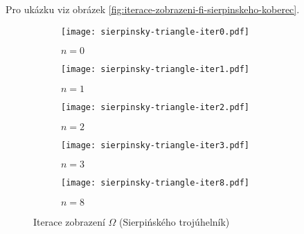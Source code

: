 Pro ukázku viz obrázek \ref{fig:iterace-zobrazeni-fi-sierpinskeho-koberec}.
\clearpage
\begin{figure}[h]
    \centering
    \begin{subfigure}{0.45\textwidth}
        \centering
        \texttt{[image: sierpinsky-triangle-iter0.pdf]}
        \begin{center}
            $n=0$
        \end{center}
    \end{subfigure}
    \qquad
    \vspace{1cm}
    \begin{subfigure}{0.45\textwidth}
        \centering
        \texttt{[image: sierpinsky-triangle-iter1.pdf]}
        \begin{center}
            $n=1$
        \end{center}
    \end{subfigure}
    \qquad
    \begin{subfigure}{0.45\textwidth}
        \centering
        \texttt{[image: sierpinsky-triangle-iter2.pdf]}
        \begin{center}
            $n=2$
        \end{center}
    \end{subfigure}
    \qquad
    \vspace{1cm}
    \begin{subfigure}{0.45\textwidth}
        \centering
        \texttt{[image: sierpinsky-triangle-iter3.pdf]}
        \begin{center}
            $n=3$
        \end{center}
    \end{subfigure}
    \qquad
    \begin{subfigure}{0.45\textwidth}
        \centering
        \texttt{[image: sierpinsky-triangle-iter8.pdf]}
        \begin{center}
            $n=8$
        \end{center}
    \end{subfigure}
    \caption{Iterace zobrazení $\Omega$  (Sierpińského trojúhelník)}
    \label{fig:iterace-zobrazeni-omega-sierpinskeho-trojuhelnik}
\end{figure}
\clearpage
